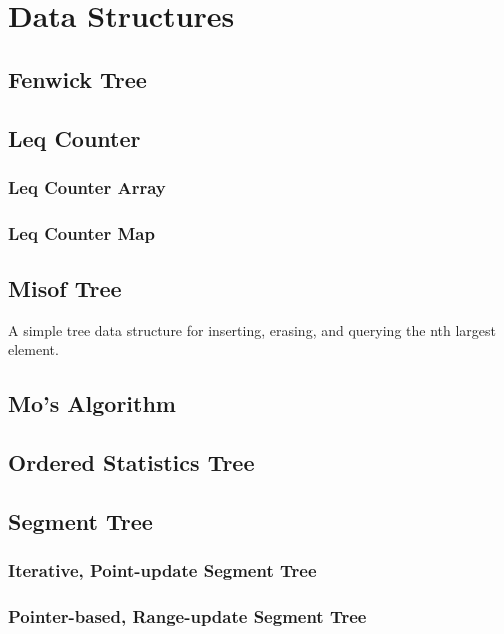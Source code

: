 \section{Data Structures}
  \subsection{Fenwick Tree}
  \subsection{Leq Counter}
    \subsubsection{Leq Counter Array}
    \subsubsection{Leq Counter Map}
  \subsection{Misof Tree}
    A simple tree data structure for inserting, erasing, and querying the nth largest element.
  \subsection{Mo's Algorithm}
  \subsection{Ordered Statistics Tree}
  \subsection{Segment Tree}
    \subsubsection{Iterative, Point-update Segment Tree}
    \subsubsection{Pointer-based, Range-update Segment Tree}

